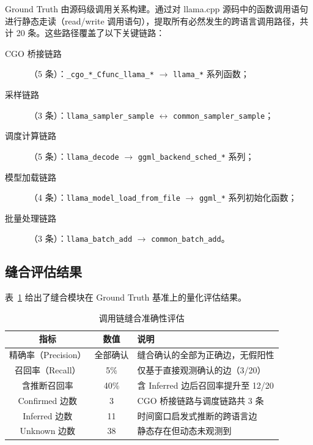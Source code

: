 Ground Truth 由源码级调用关系构建。通过对 llama.cpp 源码中的函数调用语句进行静态走读（read/write 调用语句），提取所有必然发生的跨语言调用路径，共计 20 条。这些路径覆盖了以下关键链路：

\begin{description}
    \item[CGO 桥接链路]（5 条）：\texttt{\_cgo\_*\_Cfunc\_llama\_*} $\rightarrow$ \texttt{llama\_*} 系列函数；
    \item[采样链路]（3 条）：\texttt{llama\_sampler\_sample} $\leftrightarrow$ \texttt{common\_sampler\_sample}；
    \item[调度计算链路]（5 条）：\texttt{llama\_decode} $\rightarrow$ \texttt{ggml\_backend\_sched\_*} 系列；
    \item[模型加载链路]（4 条）：\texttt{llama\_model\_load\_from\_file} $\rightarrow$ \texttt{ggml\_*} 系列初始化函数；
    \item[批量处理链路]（3 条）：\texttt{llama\_batch\_add} $\rightarrow$ \texttt{common\_batch\_add}。
\end{description}

\subsection{缝合评估结果}

表~\ref{tab:stitch_eval} 给出了缝合模块在 Ground Truth 基准上的量化评估结果。

\begin{table}[H]
    \centering
    \caption{调用链缝合准确性评估}
    \label{tab:stitch_eval}
    \begin{tabular}{|c|c|p{9.5cm}|}
        \hline
        \textbf{指标} & \textbf{数值} & \textbf{说明} \\
        \hline
        精确率（Precision） & 全部确认 & 缝合确认的全部为正确边，无假阳性 \\
        \hline
        召回率（Recall） & 5\% & 仅基于直接观测确认的边（3/20）\\
        \hline
        含推断召回率 & 40\% & 含 Inferred 边后召回率提升至 12/20 \\
        \hline
        Confirmed 边数 & 3 & CGO 桥接链路与调度链路共 3 条 \\
        \hline
        Inferred 边数 & 11 & 时间窗口启发式推断的跨语言边 \\
        \hline
        Unknown 边数 & 38 & 静态存在但动态未观测到 \\
        \hline
    \end{tabular}
\end{table}

